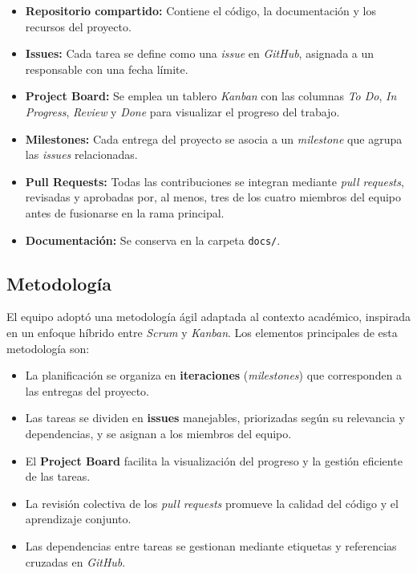 \documentclass[11pt,a4paper]{article}
\begin{document}
\begin{itemize}
    \item \textbf{Repositorio compartido:} Contiene el código, la documentación y los recursos del proyecto.
    \item \textbf{Issues:} Cada tarea se define como una \textit{issue} en \textit{GitHub}, asignada a un responsable con una fecha límite.
    \item \textbf{Project Board:} Se emplea un tablero \textit{Kanban} con las columnas \textit{To Do}, \textit{In Progress}, \textit{Review} y \textit{Done} para visualizar el progreso del trabajo.
    \item \textbf{Milestones:} Cada entrega del proyecto se asocia a un \textit{milestone} que agrupa las \textit{issues} relacionadas.
    \item \textbf{Pull Requests:} Todas las contribuciones se integran mediante \textit{pull requests}, revisadas y aprobadas por, al menos, tres de los cuatro miembros del equipo antes de fusionarse en la rama principal.
    \item \textbf{Documentación:} Se conserva en la carpeta \texttt{docs/}.
\end{itemize}

\subsection{Metodología}
\label{anexo:metodologia}
El equipo adoptó una metodología ágil adaptada al contexto académico, inspirada en un enfoque híbrido entre \textit{Scrum} y \textit{Kanban}. Los elementos principales de esta metodología son:
\begin{itemize}
    \item La planificación se organiza en \textbf{iteraciones} (\textit{milestones}) que corresponden a las entregas del proyecto.
    \item Las tareas se dividen en \textbf{issues} manejables, priorizadas según su relevancia y dependencias, y se asignan a los miembros del equipo.
    \item El \textbf{Project Board} facilita la visualización del progreso y la gestión eficiente de las tareas.
    \item La revisión colectiva de los \textit{pull requests} promueve la calidad del código y el aprendizaje conjunto.
    \item Las dependencias entre tareas se gestionan mediante etiquetas y referencias cruzadas en \textit{GitHub}.
\end{itemize}
\end{document}
